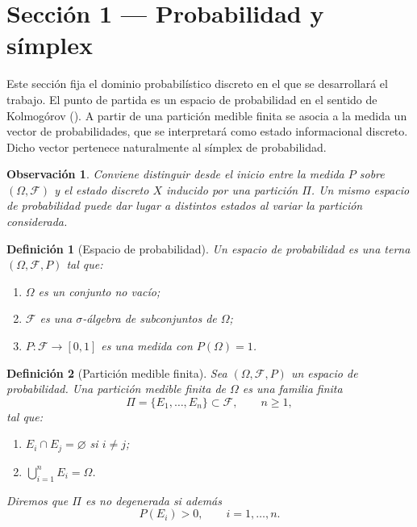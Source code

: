 \documentclass[12pt]{article}
\newtheorem{definicion}{Definición}[section]
\newtheorem{observacion}{Observación}[section]
\begin{document}
\section{Sección 1 — Probabilidad y símplex}

Este sección  fija el dominio probabilístico discreto en el que se desarrollará el trabajo. El punto de partida es un espacio de probabilidad en el sentido de Kolmogórov (\cite{Kolmogorov1933}). A partir de una partición medible finita se asocia a la medida un vector de probabilidades, que se interpretará como estado informacional discreto. Dicho vector pertenece naturalmente al símplex de probabilidad.

\begin{observacion}
Conviene distinguir desde el inicio entre la medida $P$ sobre $(\Omega,\mathcal F)$ y el estado discreto $X$ inducido por una partición $\Pi$. Un mismo espacio de probabilidad puede dar lugar a distintos estados al variar la partición considerada.
\end{observacion}

\begin{definicion}[Espacio de probabilidad]\label{def:espacio_prob}
Un \emph{espacio de probabilidad} es una terna $(\Omega,\mathcal F,P)$ tal que:
\begin{enumerate}
    \item $\Omega$ es un conjunto no vacío;
    \item $\mathcal F$ es una $\sigma$-álgebra de subconjuntos de $\Omega$;
    \item $P:\mathcal F\to[0,1]$ es una medida con $P(\Omega)=1$.
\end{enumerate}
\end{definicion}

\begin{definicion}[Partición medible finita]\label{def:particion}
Sea $(\Omega,\mathcal F,P)$ un espacio de probabilidad. Una \emph{partición medible finita} de $\Omega$ es una familia finita
\[
\Pi=\{E_1,\dots,E_n\}\subset \mathcal F,\qquad n\ge 1,
\]
tal que:
\begin{enumerate}
    \item $E_i\cap E_j=\varnothing$ si $i\neq j$;
    \item $\bigcup_{i=1}^n E_i=\Omega$.
\end{enumerate}

Diremos que $\Pi$ es \emph{no degenerada} si además
\[
P(E_i)>0,\qquad i=1,\dots,n.
\]
\end{definicion}
\end{document}
